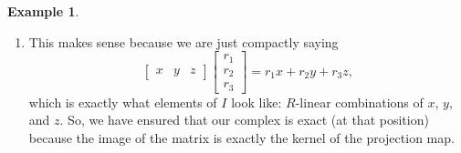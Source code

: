 \documentclass[12pt,a4paper]{article}
\theoremstyle{definition}
\newtheorem{example}[theorem]{Example}
\numberwithin{equation}{section}
\begin{document}
\begin{example}
\begin{enumerate}[label=(\arabic*)]
        \item This makes sense because we are just compactly saying
        \begin{equation*}
            \begin{bmatrix} x & y & z \end{bmatrix} \begin{bmatrix} r_1 \\ r_2 \\ r_3 \end{bmatrix} = r_1 x + r_2 y + r_3 z,
        \end{equation*}
        which is exactly what elements of $I$ look like: $R$-linear combinations of $x$, $y$, and $z$.
        So, we have ensured that our complex is exact (at that position) because the image of the matrix is exactly the kernel of the projection map.
    \end{enumerate}


\end{example}
\end{document}
